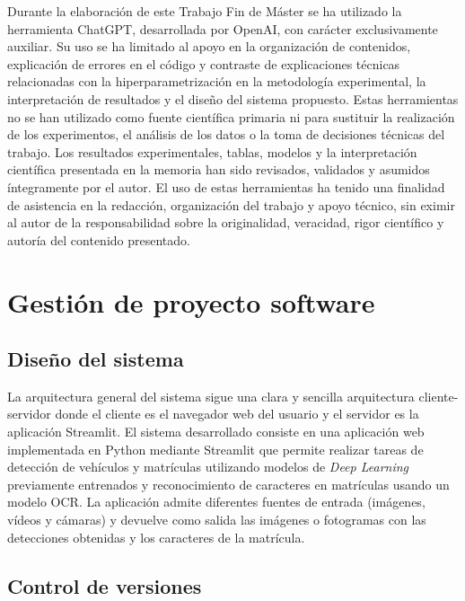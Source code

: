 \documentclass[12pt,a4paper,onecolumn,oneside]{report}
\begin{document}
Durante la elaboración de este Trabajo Fin de Máster se ha utilizado la herramienta ChatGPT, desarrollada por OpenAI, con carácter exclusivamente auxiliar. Su uso se ha limitado al apoyo en la organización de contenidos, explicación de errores en el código y contraste de explicaciones técnicas relacionadas con la hiperparametrización en la metodología experimental, la interpretación de resultados y el diseño del sistema propuesto. Estas herramientas no se han utilizado como fuente científica primaria ni para sustituir la realización de los experimentos, el análisis de los datos o la toma de decisiones técnicas del trabajo. Los resultados experimentales, tablas, modelos y la interpretación científica presentada en la memoria han sido revisados, validados y asumidos íntegramente por el autor. El uso de estas herramientas ha tenido una finalidad de asistencia en la redacción, organización del trabajo y apoyo técnico, sin eximir al autor de la responsabilidad sobre la originalidad, veracidad, rigor científico y autoría del contenido presentado.



\chapter{Gestión de proyecto software}
\label{Gestión de proyecto software}

\section{Diseño del sistema}

La arquitectura general del sistema sigue una clara y sencilla arquitectura cliente-servidor donde el cliente es el navegador web del usuario y el servidor es la aplicación Streamlit. El sistema desarrollado consiste en una aplicación web implementada en Python mediante Streamlit que permite realizar tareas de detección de vehículos y matrículas utilizando modelos de \textit{Deep Learning} previamente entrenados y reconocimiento de caracteres en matrículas usando un modelo OCR. La aplicación admite diferentes fuentes de entrada (imágenes, vídeos y cámaras) y devuelve como salida las imágenes o fotogramas con las detecciones obtenidas y los caracteres de la matrícula.

\section{Control de versiones}
\end{document}
